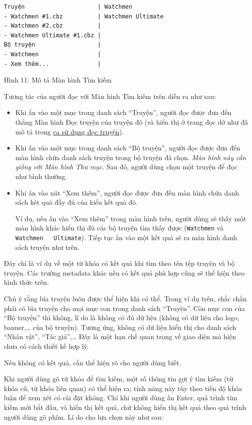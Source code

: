 \documentclass[
]{article}
\begin{document}
\begin{verbatim}
Truyện                     | Watchmen
- Watchmen #1.cbz          | Watchmen Ultimate
- Watchmen #2.cbz          |
- Watchmen Ultimate #1.cbz |
Bộ truyện                  |
- Watchmen                 |
- Xem thêm...              |
\end{verbatim}

Hình 11: Mô tả Màn hình Tìm kiếm

Tương tác của người đọc với Màn hình Tìm kiếm trên diễn ra như sau:

\begin{itemize}
\item
  Khi ấn vào một mục trong danh sách ``Truyện'', người đọc được đưa đến
  thẳng Màn hình Đọc truyện của truyện đó (và hiển thị ở trang đọc dở
  như đã mô tả trong \protect\hyperlink{P3.3.3-read-comic}{ca sử dụng
  đọc truyện}).
\item
  Khi ấn vào một mục trong danh sách ``Bộ truyện'', người đọc được đưa
  đến màn hình chứa danh sách truyện trong bộ truyện đã chọn. \emph{Màn
  hình này cần giống với Màn hình Thư mục}. Sau đó, người dùng chọn một
  truyện để đọc như bình thường.
\item
  Khi ấn vào nút ``Xem thêm'', người đọc được đưa đến màn hình chứa danh
  sách két quả đầy đủ của kiểu kết quả đó.

  Ví dụ, nếu ấn vào ``Xem thêm'' trong màn hình trên, người dùng sẽ thấy
  một màn hình khác hiển thị đủ các bộ truyện tìm thấy được
  (\texttt{Watchmen} và \texttt{Watchmen\ \ \ Ultimate}). Tiếp tục ấn
  vào một kết quả sẽ ra màn hình danh sách truyện như trên.
\end{itemize}

Đây chỉ là ví dụ về một từ khóa có kết quả khi tìm theo tên tệp truyện
và bộ truyện. Các trường metadata khác nếu có kết quả phù hợp cũng sẽ
thể hiện theo hình thức trên.

Chú ý rằng bìa truyện luôn được thể hiện khi có thể. Trong ví dụ trên,
chắc chắn phải có bìa truyện cho mọi mục con trong danh sách ``Truyện''.
Còn mục con của ``Bộ truyện'' thì không, lí do là không có đủ dữ liệu
(không có dữ liệu cho logo, banner,\ldots{} của bộ truyện). Tương ứng,
không có dữ liệu hiển thị cho danh sách ``Nhân vật'', ``Tác
giả'',\ldots{} Đây là một hạn chế quan trọng về giao diện mà hiện chưa
có cách thiết kế hợp lý.

Nếu không có kết quả, cần thể hiện rõ cho người dùng biết.

Khi người dùng gõ từ khóa để tìm kiếm, một số thông tin gợi ý tìm kiếm
(từ khóa cũ, từ khóa liên quan) có thể hiện ra; tính năng này tùy theo
tiến độ khóa luận để xem xét có cài đặt không. Chỉ khi người dùng ấn
Enter, quá trình tìm kiếm mới bắt đầu, và hiển thị kết quả, chứ không
hiển thị kết quả theo quá trình người dùng gõ phím. Lí do cho lựa chọn
này như sau:
\end{document}
